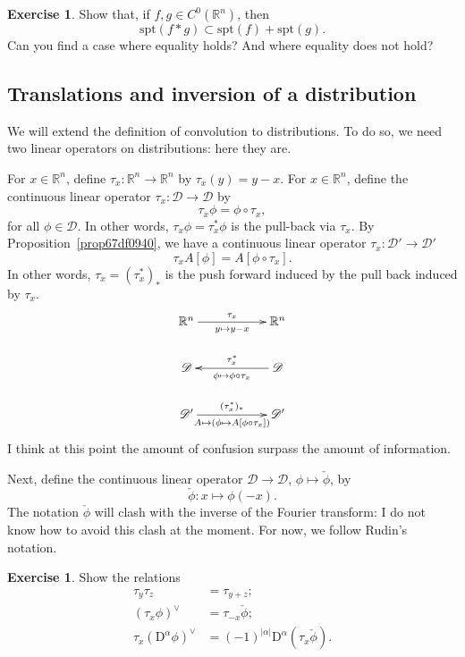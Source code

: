 \documentclass[a4paper,9pt]{amsart}
\newcommand{\scr}[1]{\mathscr{#1}}
\newcommand{\R}{\mathbb{R}}	%
\newcommand{\Diff}{\mathrm{D}}
\newcommand{\spt}{\mathrm{spt}}
\theoremstyle{plain}
\theoremstyle{definition}
\newtheorem{exercise}[proposition]{Exercise}%
\theoremstyle{remark}
\begin{document}
\begin{exercise}\label{ex67ea4f16}
	Show that, if $f,g\in C^0(\R^n)$, then
	\begin{equation}
		\spt(f*g) \subset \spt(f) + \spt(g) .
	\end{equation}
	Can you find a case where equality holds? And where equality does not hold?
\end{exercise}

\subsection{Translations and inversion of a distribution}\label{sub67df26c0}
We will extend the definition of convolution to distributions.
To do so, we need two linear operators on distributions: here they are.

For $x\in\R^n$, define $\tau_x:\R^n\to\R^n$ by $\tau_x(y) = y-x$.
For $x\in\R^n$, define the continuous linear operator $\tau_x:\scr D\to\scr D$ by
\begin{equation}
	\tau_x\phi = \phi\circ\tau_x ,
\end{equation}
for all $\phi\in\scr D$.
In other words, $\tau_x\phi = \tau_x^*\phi$ is the pull-back via $\tau_x$.
By Proposition~\ref{prop67df0940}, we have a continuous linear operator $\tau_x:\scr D'\to \scr D'$ 
\begin{equation}
	\tau_xA[\phi] = A[\phi\circ\tau_x] .
\end{equation}
In other words, $\tau_x = (\tau_x^*)_*$ is the push forward induced by the pull back induced by $\tau_x$.
\[
\xymatrix{
\R^n \ar[rr]^{\tau_x}_{y\mapsto y-x} && \R^n \\
\scr  D && \scr D \ar[ll]_{\tau_x^*}^{\phi\mapsto \phi\circ\tau_x} \\
\scr D' \ar[rr]^{(\tau_x^*)_*}_{A\mapsto (\phi\mapsto A[\phi\circ\tau_x])} && \scr D'
}
\]
I think at this point the amount of confusion surpass the amount of information.

Next, define the continuous linear operator $\scr D\to\scr D$, $\phi\mapsto \check\phi$, by
\begin{equation}
	\check \phi : x\mapsto \phi(-x) .
\end{equation}
The notation $\check\phi$ will clash with the inverse of the Fourier transform: I do not know how to avoid this clash at the moment. 
For now, we follow Rudin's notation.

\begin{exercise}
	Show the relations
	\begin{align}
	\tau_y \tau_z &= \tau_{y+z} ;\\
	\label{eq67f29d18}
	(\tau_x\phi)^{\vee} &= \tau_{-x}\check\phi ;\\
	\label{eq67e2886e}
	\tau_x (\Diff^\alpha \phi)^\vee &= (-1)^{|\alpha|} \Diff^\alpha(\tau_x\check\phi) .
	\end{align}
\end{exercise}
\end{document}
